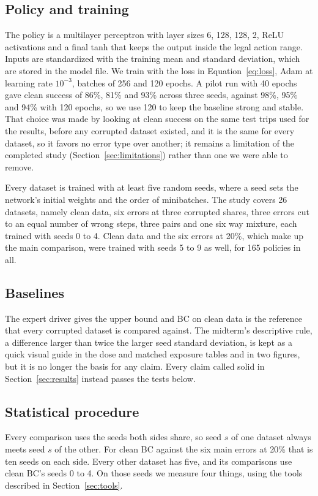 \documentclass[conference]{IEEEtran}
\begin{document}
\subsection{Policy and training}\label{sec:training}
The policy is a multilayer perceptron with layer sizes 6, 128, 128, 2, ReLU activations and a final tanh that
keeps the output inside the legal action range. Inputs are standardized with the training mean and standard
deviation, which are stored in the model file. We train with the loss in Equation~\eqref{eq:loss}, Adam
\cite{adam} at learning rate $10^{-3}$, batches of 256 and 120 epochs. A pilot run with 40 epochs gave clean
success of 86\%, 81\% and 93\% across three seeds, against 98\%, 95\% and 94\% with 120 epochs, so we use 120 to
keep the baseline strong and stable. That choice was made by looking at clean success on the same test trips used
for the results, before any corrupted dataset existed, and it is the same for every dataset, so it favors no
error type over another; it remains a limitation of the completed study (Section~\ref{sec:limitations}) rather
than one we were able to remove.

Every dataset is trained with at least five random seeds, where a seed sets the network's initial weights and the
order of minibatches. The study covers 26 datasets, namely clean data, six errors at three corrupted shares,
three errors cut to an equal number of wrong steps, three pairs and one six way mixture, each trained with
seeds 0 to 4. Clean data and the six errors at 20\%, which make up the main comparison, were trained with seeds
5 to 9 as well, for 165 policies in all.

\subsection{Baselines}
The expert driver gives the upper bound and BC on clean data is the reference that every corrupted dataset is
compared against. The midterm's descriptive rule, a difference larger than twice the larger seed standard
deviation, is kept as a quick visual guide in the dose and matched exposure tables and in two figures, but it
is no longer the basis for any claim. Every claim called solid in Section~\ref{sec:results} instead passes the
tests below.

\subsection{Statistical procedure}\label{sec:stats}
Every comparison uses the seeds both sides share, so seed $s$ of one dataset always meets seed $s$ of the other.
For clean BC against the six main errors at 20\% that is ten seeds on each side. Every other dataset has five,
and its comparisons use clean BC's seeds 0 to 4. On those seeds we measure four things, using the tools
described in Section~\ref{sec:tools}.
\end{document}
